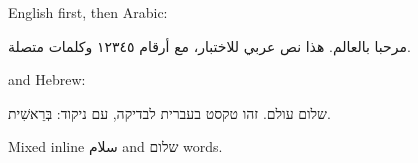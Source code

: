 \documentclass{article}
\begin{document}
English first, then Arabic:
\begin{Arabic}
مرحبا بالعالم. هذا نص عربي للاختبار، مع أرقام ١٢٣٤٥ وكلمات متصلة.
\end{Arabic}
and Hebrew:
\begin{hebrew}
שלום עולם. זהו טקסט בעברית לבדיקה, עם ניקוד: בְּרֵאשִׁית.
\end{hebrew}
Mixed inline \textarabic{سلام} and \texthebrew{שלום} words.
\end{document}
